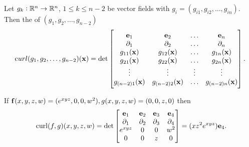 \begin{df} Let $g_k:\mathbb{R}^n \rightarrow \mathbb{R}^n$, $1 \leq k \leq n -
2$ be vector fields with  $g_i = (g_{i1}, g_{i2}, \ldots ,
g_{in}).$ Then the  of $(g_1, g_2, \ldots, g_{n - 2})$
$${\mathrm curl} (g_1, g_2, \ldots, g_{n - 2}){\left({\mathbf x}\right)}
= \det\begin{bmatrix} {\mathbf e}_1 &  {\mathbf e}_2 &  \dots &
{\mathbf e}_{n}  \cr \partial_1&  \partial_2 &
\dots  &  \partial_n \cr g_{11}({\mathbf x}) &
g_{12}({\mathbf x}) & \dots & g_{1n}({\mathbf x}) \cr g_{21}({\mathbf x})
& g_{22}({\mathbf x}) & \ldots & g_{2n}({\mathbf x}) \cr \vdots & \vdots
& \vdots & \vdots \cr g_{(n - 2)1}({\mathbf x}) & g_{(n -
2)2}({\mathbf x}) & \ldots & g_{(n - 2)n}({\mathbf x}) \cr
\end{bmatrix}.$$
\end{df}

\begin{exa}If $\mathbf{ f}(x, y, z, w) = (e^{xyz}, 0, 0, w^2), g(x, y, z, w) = (0, 0, z, 0)$ then
$$\text{ curl} (f, g)(x,y,z,w) = \det \begin{bmatrix}
{\mathbf e}_1 & {\mathbf e}_2 & {\mathbf e}_3 & {\mathbf e}_4 \cr
\partial_1 &  \partial_2 &  \partial_3  &
 \partial_4 \cr e^{xyz} & 0 & 0 & w^2 \cr 0 & 0 & z & 0
\end{bmatrix} = (xz^2e^{xyz}){\mathbf e}_4.
$$
\end{exa}



